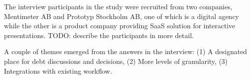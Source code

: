 The interview participants in the study were recruited from two companies, Mentimeter AB and Prototyp Stockholm AB, one of which is a digital agency while the other is a product company providing SaaS solution for interactive presentations. TODO: describe the participants in more detail.

A couple of themes emerged from the answers in the interview: (1) A designated place for debt discussions and decisions, (2) More levels of granularity, (3) Integrations with existing workflow.